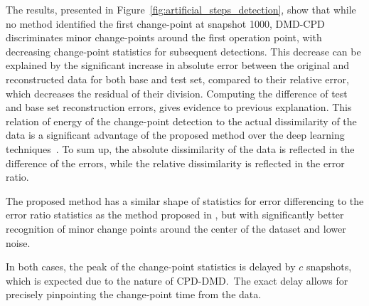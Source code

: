 The results, presented in Figure~\ref{fig:artificial_steps_detection}, show that while no method identified the first change-point at snapshot 1000, DMD-CPD discriminates minor change-points around the first operation point, with decreasing change-point statistics for subsequent detections. This decrease can be explained by the significant increase in absolute error between the original and reconstructed data for both base and test set, compared to their relative error, which decreases the residual of their division. Computing the difference of test and base set reconstruction errors, gives evidence to previous explanation. This relation of energy of the change-point detection to the actual dissimilarity of the data is a significant advantage of the proposed method over the deep learning techniques~\citep{DeRyck2021}. To sum up, the absolute dissimilarity of the data is reflected in the difference of the errors, while the relative dissimilarity is reflected in the error ratio.

The proposed method has a similar shape of statistics for error differencing to the error ratio statistics as the method proposed in \citet{Kawahara2007}, but with significantly better recognition of minor change points around the center of the dataset and lower noise.

In both cases, the peak of the change-point statistics is delayed by \(c\) snapshots, which is expected due to the nature of CPD-DMD.~The exact delay allows for precisely pinpointing the change-point time from the data.

